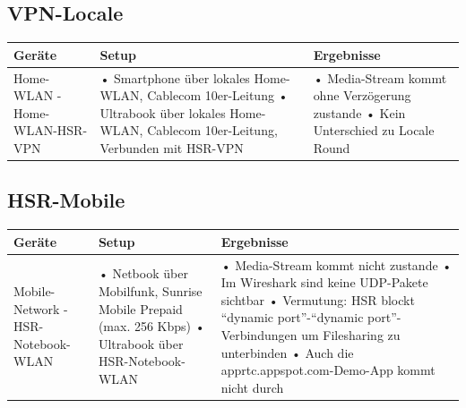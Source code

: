 \begin{landscape}
		\subsection{VPN-Locale}
			\begin{tabularx}{1.4\textwidth}{|lXX|}
				\hline
				\textbf{Geräte} & \textbf{Setup} & \textbf{Ergebnisse} \\
				\hline
					Home-WLAN - Home-WLAN-HSR-VPN
				&
					• Smartphone über lokales Home-WLAN, Cablecom 10er-Leitung\newline
					• Ultrabook über lokales Home-WLAN, Cablecom 10er-Leitung,
					Verbunden mit HSR-VPN\newline
				& 
					• Media-Stream kommt ohne Verzögerung zustande\newline
					• Kein Unterschied zu Locale Round\\
				\hline
			\end{tabularx}
	
		\subsection{HSR-Mobile}
			\begin{tabularx}{1.4\textwidth}{|lXX|}
				\hline
				\textbf{Geräte} & \textbf{Setup} & \textbf{Ergebnisse} \\
				\hline
					Mobile-Network - HSR-Notebook-WLAN
				&
					• Netbook über Mobilfunk, Sunrise Mobile Prepaid (max. 256 Kbps)\newline
					• Ultrabook über HSR-Notebook-WLAN\newline
				& 
					• Media-Stream kommt nicht zustande\newline
					• Im Wireshark sind keine UDP-Pakete sichtbar\newline
					• Vermutung: HSR blockt ``dynamic port''-``dynamic port''-Verbindungen um
					Filesharing zu unterbinden\newline
					• Auch die apprtc.appspot.com-Demo-App kommt nicht durch\\
				\hline
			\end{tabularx}
				
\end{landscape}
